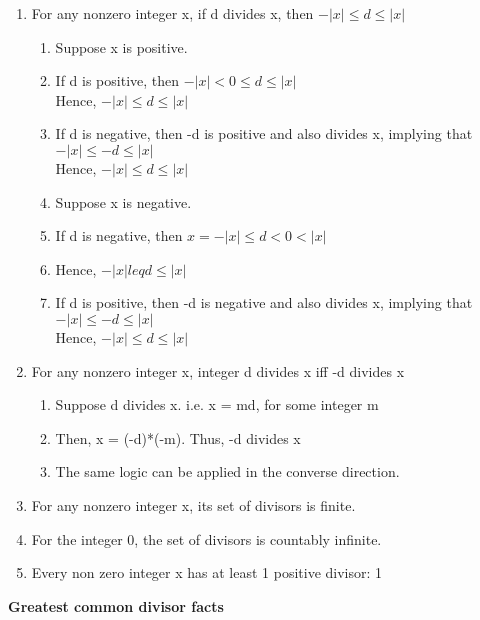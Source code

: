 \documentclass{article}
\begin{document}
\begin{enumerate}
\item For any nonzero integer x, if d divides x, then $ -|x| \leq d \leq |x| $
\begin{enumerate}
\item Suppose x is positive.
\item If d is positive, then $ -|x| < 0 \leq d \leq |x| $
\\ Hence, $ -|x| \leq d \leq |x| $
\item If d is negative, then -d is positive and also divides x, implying that $ -|x| \leq -d \leq |x| $
\\ Hence, $ -|x| \leq d \leq |x| $
\item Suppose x is negative.
\item If d is negative, then $ x = -|x| \leq d < 0 < |x| $
\item Hence, $ -|x| leq d \leq |x| $
\item If d is positive, then -d is negative and also divides x, implying that $
-|x| \leq -d \leq |x| $
\\ Hence, $ -|x| \leq d \leq |x| $
\end{enumerate}

\item For any nonzero integer x, integer d divides x iff -d divides x
\begin{enumerate}
\item Suppose d divides x. i.e. x = md, for some integer m
\item Then, x = (-d)*(-m). Thus, -d divides x
\item The same logic can be applied in the converse direction.
\end{enumerate}

\item For any nonzero integer x, its set of divisors is finite.
\item For the integer 0, the set of divisors is countably infinite.

\item Every non zero integer x has at least 1 positive divisor: 1
\end{enumerate}

\textbf{Greatest common divisor facts}
\end{document}
